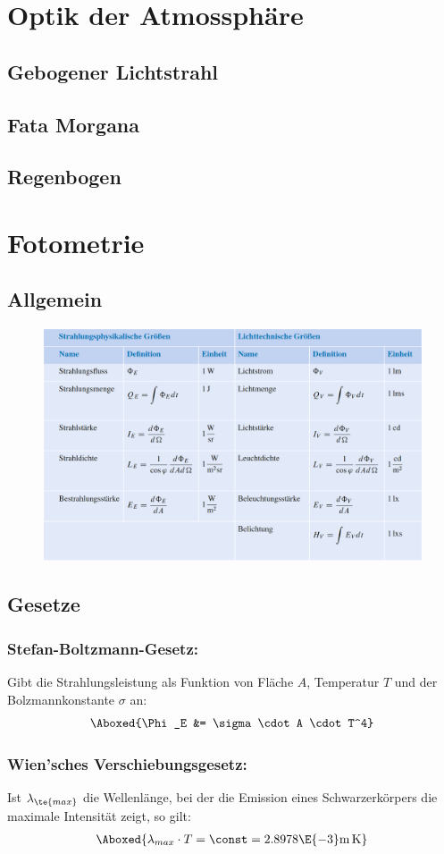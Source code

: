 \documentclass[twocolumn, unnumberedsubsub]{summery_5.0} %
\begin{document}
\section{Optik der Atmossphäre}
\subsection{Gebogener Lichtstrahl}
\subsection{Fata Morgana}
\subsection{Regenbogen}

\section{Fotometrie}
\subsection{Allgemein}
\begin{figure}[H]
    \centering
    \includegraphics[width=.5\textwidth]{1.png}
\end{figure}


\subsection{Gesetze}
\subsubsection{Stefan-Boltzmann-Gesetz:}
    Gibt die Strahlungsleistung als Funktion von Fläche $A$, Temperatur $T$ und der Bolzmannkonstante $\sigma$ an: 
    \begin{align*}
        \Aboxed{\Phi_E &= \sigma \cdot A \cdot T^4}
    \end{align*}\ttight

\subsubsection{Wien'sches Verschiebungsgesetz:}
    Ist \(\lambda_{\te{max}}\) die Wellenlänge, bei der die Emission eines Schwarzerkörpers
    die maximale Intensität zeigt, so gilt:
    \begin{align*}
        \Aboxed{\lambda_{max}\cdot T = \const = 2.8978 \E{-3} \mathrm{m\, K}}
    \end{align*}\ttight
\end{document}
